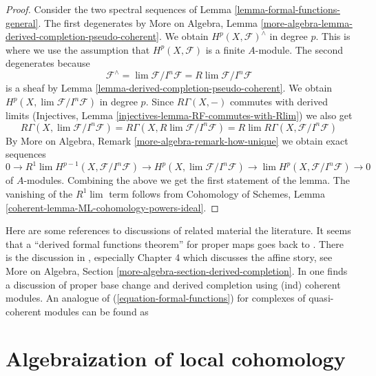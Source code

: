 \begin{proof}
Consider the two spectral sequences of
Lemma \ref{lemma-formal-functions-general}.
The first degenerates by More on Algebra, Lemma
\ref{more-algebra-lemma-derived-completion-pseudo-coherent}.
We obtain $H^p(X, \mathcal{F})^\wedge$ in degree $p$.
This is where we use the assumption that $H^p(X, \mathcal{F})$ is
a finite $A$-module. The second degenerates because
$$
\mathcal{F}^\wedge = \lim \mathcal{F}/I^n\mathcal{F} =
R\lim \mathcal{F}/I^n\mathcal{F}
$$
is a sheaf by Lemma \ref{lemma-derived-completion-pseudo-coherent}.
We obtain $H^p(X, \lim \mathcal{F}/I^n\mathcal{F})$ in degree $p$.
Since $R\Gamma(X, -)$ commutes with derived limits
(Injectives, Lemma \ref{injectives-lemma-RF-commutes-with-Rlim})
we also get
$$
R\Gamma(X, \lim \mathcal{F}/I^n\mathcal{F}) =
R\Gamma(X, R\lim \mathcal{F}/I^n\mathcal{F}) =
R\lim R\Gamma(X, \mathcal{F}/I^n\mathcal{F})
$$
By More on Algebra, Remark
\ref{more-algebra-remark-how-unique}
we obtain exact sequences
$$
0 \to
R^1\lim H^{p - 1}(X, \mathcal{F}/I^n\mathcal{F}) \to
H^p(X, \lim \mathcal{F}/I^n\mathcal{F}) \to
\lim H^p(X, \mathcal{F}/I^n\mathcal{F}) \to 0
$$
of $A$-modules. Combining the above we get the first statement of the lemma.
The vanishing of the $R^1\lim$ term follows from
Cohomology of Schemes, Lemma \ref{coherent-lemma-ML-cohomology-powers-ideal}.
\end{proof}

\begin{remark}
\label{remark-references}
Here are some references to discussions of related material the literature.
It seems that a ``derived formal functions theorem'' for proper maps
goes back to \cite[Theorem 6.3.1]{lurie-thesis}.
There is the discussion in \cite{dag12}, especially
Chapter 4 which discusses the affine story, see
More on Algebra, Section \ref{more-algebra-section-derived-completion}.
In \cite[Section 2.9]{G-R} one finds a discussion of proper base change and
derived completion using (ind) coherent modules.
An analogue of (\ref{equation-formal-functions})
for complexes of quasi-coherent modules can be found as
\cite[Theorem 6.5]{HL-P}
\end{remark}







\section{Algebraization of local cohomology}
\label{section-algebraization-sections-general}

